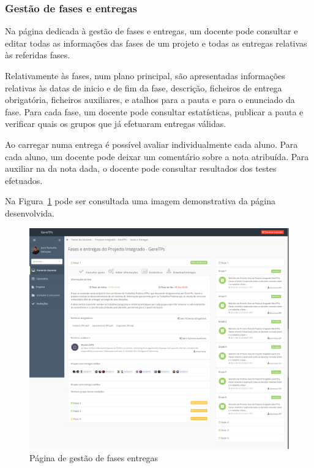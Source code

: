 \subsubsection{Gestão de fases e entregas}
\label{ssub:gestao_fases}

Na página dedicada à gestão de fases e entregas, um docente pode consultar e editar todas as informações das fases de um projeto e todas as entregas relativas às referidas fases.

Relativamente às fases, num plano principal, são apresentadas informações relativas às datas de inicio e de fim da fase, descrição, ficheiros de entrega obrigatória, ficheiros auxiliares, e atalhos para a pauta e para o enunciado da fase. Para cada fase, um docente pode consultar estatísticas, publicar a pauta e verificar quais os grupos que já efetuaram entregas válidas.

Ao carregar numa entrega é possível avaliar individualmente cada aluno. Para cada aluno, um docente pode deixar um comentário sobre a nota atribuída. Para auxiliar na da nota dada, o docente pode consultar resultados dos testes efetuados.

Na Figura~\ref{fig:teacher_deliveries} pode ser consultada uma imagem demonstrativa da página desenvolvida.

\begin{figure}[H]
  \centering
  \includegraphics[width=1\textwidth,center]{images/implementacao/docentes/deliveries}
  \caption{Página de gestão de fases entregas}
  \label{fig:teacher_deliveries}
\end{figure}
